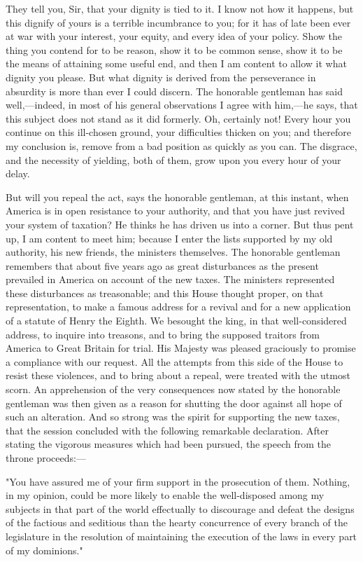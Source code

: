 They tell you, Sir, that your dignity is tied to it. I know not how it happens, but this dignify of yours is a terrible incumbrance to you; for it has of late been ever at war with your interest, your equity, and every idea of your policy. Show the thing you contend for to be reason, show it to be common sense, show it to be the means of attaining some useful end, and then I am content to allow it what dignity you please. But what dignity is derived from the perseverance in absurdity is more than ever I could discern. The honorable gentleman has said well,—indeed, in most of his general observations I agree with him,—he says, that this subject does not stand as it did formerly. Oh, certainly not! Every hour you continue on this ill-chosen ground, your difficulties thicken on you; and therefore my conclusion is, remove from a bad position as quickly as you can. The disgrace, and the necessity of yielding, both of them, grow upon you every hour of your delay.

But will you repeal the act, says the honorable gentleman, at this instant, when America is in open resistance to your authority, and that you have just revived your system of taxation? He thinks he has driven us into a corner. But thus pent up, I am content to meet him; because I enter the lists supported by my old authority, his new friends, the ministers themselves. The honorable gentleman remembers that about five years ago as great disturbances as the present prevailed in America on account of the new taxes. The ministers represented these disturbances as treasonable; and this House thought proper, on that representation, to make a famous address for a revival and for a new application of a statute of Henry the Eighth. We besought the king, in that well-considered address, to inquire into treasons, and to bring the supposed traitors from America to Great Britain for trial. His Majesty was pleased graciously to promise a compliance with our request. All the attempts from this side of the House to resist these violences, and to bring about a repeal, were treated with the utmost scorn. An apprehension of the very consequences now stated by the honorable gentleman was then given as a reason for shutting the door against all hope of such an alteration. And so strong was the spirit for supporting the new taxes, that the session concluded with the following remarkable declaration. After stating the vigorous measures which had been pursued, the speech from the throne proceeds:—

"You have assured me of your firm support in the prosecution of them. Nothing, in my opinion, could be more likely to enable the well-disposed among my subjects in that part of the world effectually to discourage and defeat the designs of the factious and seditious than the hearty concurrence of every branch of the legislature in the resolution of maintaining the execution of the laws in every part of my dominions."

